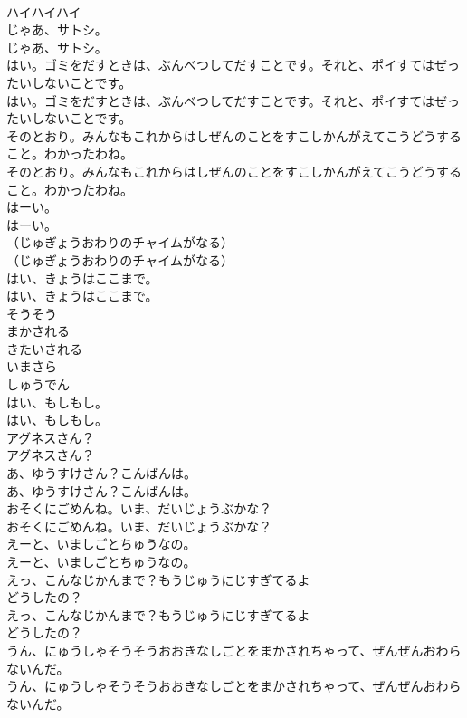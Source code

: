 \documentclass[8pt]{extreport}
\begin{document}
\begin{CJK}{UTF8}{min}
\\	ハイハイハイ
\\	じゃあ、サトシ。
\\	じゃあ、サトシ。
\\	はい。ゴミをだすときは、ぶんべつしてだすことです。それと、ポイすてはぜったいしないことです。
\\	はい。ゴミをだすときは、ぶんべつしてだすことです。それと、ポイすてはぜったいしないことです。
\\	そのとおり。みんなもこれからはしぜんのことをすこしかんがえてこうどうすること。わかったわね。
\\	そのとおり。みんなもこれからはしぜんのことをすこしかんがえてこうどうすること。わかったわね。
\\	はーい。
\\	はーい。
\\	（じゅぎょうおわりのチャイムがなる）
\\	（じゅぎょうおわりのチャイムがなる）
\\	はい、きょうはここまで。
\\	はい、きょうはここまで。
\\	そうそう
\\	まかされる
\\	きたいされる
\\	いまさら
\\	しゅうでん
\\	はい、もしもし。
\\	はい、もしもし。
\\	アグネスさん？
\\	アグネスさん？
\\	あ、ゆうすけさん？こんばんは。
\\	あ、ゆうすけさん？こんばんは。
\\	おそくにごめんね。いま、だいじょうぶかな？
\\	おそくにごめんね。いま、だいじょうぶかな？
\\	えーと、いましごとちゅうなの。
\\	えーと、いましごとちゅうなの。
\\	えっ、こんなじかんまで？もうじゅうにじすぎてるよ
\\	どうしたの？
\\	えっ、こんなじかんまで？もうじゅうにじすぎてるよ
\\	どうしたの？
\\	うん、にゅうしゃそうそうおおきなしごとをまかされちゃって、ぜんぜんおわらないんだ。
\\	うん、にゅうしゃそうそうおおきなしごとをまかされちゃって、ぜんぜんおわらないんだ。

\end{CJK}
\end{document}

